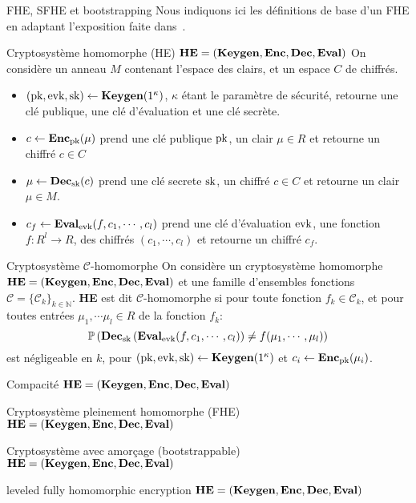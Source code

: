 \begin{section}{FHE, SFHE et bootstrapping}
Nous indiquons ici les définitions de base d'un FHE en adaptant
l'exposition faite dans~\cite{FOCS:BraVai11}.

\begin{definition}{Cryptosystème homomorphe (HE)}
$\text{\textbf{HE}} = (\text{\textbf{Keygen}}, \text{\textbf{Enc}}, \text{\textbf{Dec}}, \text{\textbf{Eval}})$
On considère un anneau $M$ contenant l'espace des clairs, et un espace $C$ de chiffrés.
\begin{itemize}
\item $(\text{pk}, \text{evk}, \text{sk}) \leftarrow \text{\textbf{Keygen}}(1^\kappa)$, $\kappa$ étant le paramètre de sécurité, retourne une clé publique, une clé d'évaluation et une clé secrète.
\item $c \leftarrow \text{\textbf{Enc}}_{\text{pk}}(\mu)$ prend une clé publique $\text{pk}$, un clair $\mu \in R$ et retourne un chiffré $c\in C$
\item $\mu \leftarrow \text{\textbf{Dec}}_{\text{sk}}(c)$ prend une clé secrete $\text{sk}$, un chiffré $c \in C$ et retourne un clair $\mu \in M$.
\item $c_f \leftarrow \text{\textbf{Eval}}_{\text{evk}}(f, c_1,\cdots,c_l)$ prend une clé d'évaluation
$\text{evk}$, une fonction $f: R^l \rightarrow R$, des chiffrés $(c_1, \cdots, c_l)$ et retourne un chiffré $c_f$.
\end{itemize}
\end{definition}

\begin{definition}{Cryptosystème $\mathcal{C}$-homomorphe}
On considère un cryptosystème homomorphe 
$\text{\textbf{HE}} = (\text{\textbf{Keygen}}, \text{\textbf{Enc}}, \text{\textbf{Dec}}, \text{\textbf{Eval}})$ et une famille d'ensembles fonctions $\mathcal{C} = \{\mathcal{C}_{k} \}_{k\in \mathbb{N}}$. \textbf{HE} est dit 
$\mathcal{C}$-homomorphe  si pour toute fonction $f_k \in \mathcal{C}_k$, et
pour toutes entrées $\mu_1, \cdots \mu_l \in R$ de la fonction $f_k$:
\[ \mathbb{P}\left(\text{\textbf{Dec}}_{\text{sk}}\left(\text{\textbf{Eval}}_{\text{evk}}(f,c_1,\cdots,c_l)\right) \neq f(\mu_1,\cdots,\mu_l)  \right) \]
est négligeable en $k$, pour $(\text{pk}, \text{evk}, \text{sk}) \leftarrow \text{\textbf{Keygen}}(1^\kappa)$ et $c_i \leftarrow \text{\textbf{Enc}}_{\text{pk}}(\mu_i)$.
\end{definition}

\begin{definition}{Compacité}
$\text{\textbf{HE}} = (\text{\textbf{Keygen}}, \text{\textbf{Enc}}, \text{\textbf{Dec}}, \text{\textbf{Eval}})$

\end{definition}

\begin{definition}{Cryptosystème pleinement homomorphe (FHE)}
$\text{\textbf{HE}} = (\text{\textbf{Keygen}}, \text{\textbf{Enc}}, \text{\textbf{Dec}}, \text{\textbf{Eval}})$

\end{definition}

\begin{definition}{Cryptosystème avec amorçage (bootstrappable)}
$\text{\textbf{HE}} = (\text{\textbf{Keygen}}, \text{\textbf{Enc}}, \text{\textbf{Dec}}, \text{\textbf{Eval}})$

\end{definition}

\begin{definition}{leveled fully homomorphic encryption}
$\text{\textbf{HE}} = (\text{\textbf{Keygen}}, \text{\textbf{Enc}}, \text{\textbf{Dec}}, \text{\textbf{Eval}})$

\end{definition}


\end{section}
